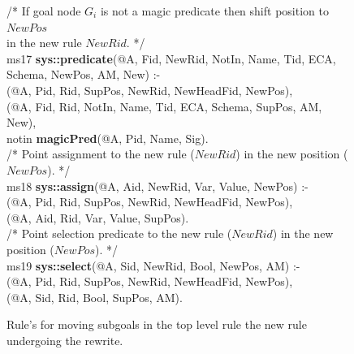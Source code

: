 \begin{figure}[!t]
\ssp
\centering
\begin{boxedminipage}{\linewidth}
/* If goal node $G_i$ is not a magic predicate then shift position to $NewPos$  \\
   in the new rule $NewRid$. */ \\
ms17 {\bf sys::predicate}(@A, Fid, NewRid, NotIn, Name, Tid, ECA, Schema, NewPos, AM, New) :- \\
(@A, Pid, Rid, SupPos, NewRid, NewHeadFid, NewPos), \\
(@A, Fid, Rid, NotIn, Name, Tid, ECA, Schema, SupPos, AM, New), \\
\datalogspace notin {\bf magicPred}(@A, Pid, Name, Sig). \\
	
/* Point assignment to the new rule ($NewRid$) in the new position ($NewPos$). */ \\
ms18 {\bf sys::assign}(@A, Aid, NewRid, Var, Value, NewPos) :- \\
(@A, Pid, Rid, SupPos, NewRid, NewHeadFid, NewPos), \\
(@A, Aid, Rid, Var, Value, SupPos). \\
	
/* Point selection predicate to the new rule ($NewRid$) in the new position ($NewPos$). */ \\
ms19 {\bf sys::select}(@A, Sid, NewRid, Bool, NewPos, AM) :- \\
(@A, Pid, Rid, SupPos, NewRid, NewHeadFid, NewPos), \\
(@A, Sid, Rid, Bool, SupPos, AM).

\end{boxedminipage}
\caption{\label{ch:evita:fig:mpgoal} Rule's for moving subgoals in the top level rule
the new rule undergoing the rewrite. }
\end{figure}

